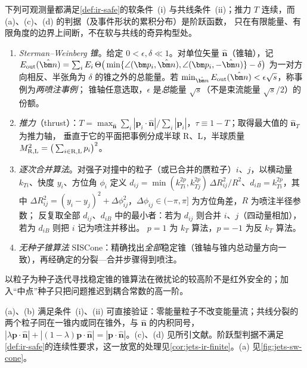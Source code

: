 \begin{definition}[红外安全的喷注定义与事件形状]\label{def:jets-algorithms}
下列可观测量都满足\cref{def:ir-safe}的软条件~(i) 与共线条件~(ii)；推力 $T$ 连续，而 (a)、(c)、(d) 的判据（及事件形状的累积分布）是阶跃函数，
只在有限能量、有限角度的边界上间断，不在软与共线的奇异构型处。
\begin{enumerate}[label=(\alph*),leftmargin=2.2em,itemsep=1pt,topsep=2pt]
\item \emph{Sterman--Weinberg 锥}\cite{StermanWeinberg1977}。给定 $0<\epsilon,\delta\ll1$。对单位矢量 $\hat{\bm n}$（锥轴），记
$E_{\rm out}(\hat{\bm n})=\sum_iE_i\,\Theta\big(\min\{\angle(\bm p_i,\hat{\bm n}),\angle(\bm p_i,-\hat{\bm n})\}-\delta\big)$
为一对方向相反、半张角为 $\delta$ 的锥之外的总能量。若 $\min_{\hat{\bm n}}E_{\rm out}(\hat{\bm n})<\epsilon\sqrt s$，称事例为\emph{两喷注事例}；
锥轴任意选取，$\epsilon$ 是\emph{总}能量 $\sqrt s$（不是束流能量 $\sqrt s/2$）的份额。
\item \emph{推力}（thrust）\cite{Farhi1977}：$T=\max_{\hat{\bm n}}\sum_i|\bm p_i\cdot\hat{\bm n}|/\sum_i|\bm p_i|$，$\tau\equiv1-T$；取得最大值的 $\hat{\bm n}_T$ 为推力轴，
垂直于它的平面把事例分成半球 R、L，半球质量 $M_{\rm R,L}^2=\big(\sum_{i\in\mathrm{R,L}}p_i\big)^2$。
\item \emph{逐次合并算法}。对强子对撞中的粒子（或已合并的赝粒子）$i$、$j$，以横动量 $k_{Ti}$、快度 $y_i$、方位角 $\phi_i$ 定义
$d_{ij}=\min(k_{Ti}^{2p},k_{Tj}^{2p})\,\Delta R_{ij}^2/R^2$、$d_{iB}=k_{Ti}^{2p}$，其中 $\Delta R_{ij}^2=(y_i-y_j)^2+\Delta\phi_{ij}^2$，$\Delta\phi_{ij}\in(-\pi,\pi]$ 为方位角差，$R$ 为喷注半径参数；
反复取全部 $d_{ij}$、$d_{iB}$ 中的最小者：若为 $d_{ij}$ 则合并 $i$、$j$（四动量相加），若为 $d_{iB}$ 则把 $i$ 记为喷注并移出。
$p=1$ 为 $k_T$ 算法\cite{CataniEtAl1993kt,EllisSoper1993}，$p=-1$ 为反 $k_T$ 算法\cite{CacciariSalamSoyez2008}。
\item \emph{无种子锥算法} SISCone\cite{SalamSoyez2007}：精确找出\emph{全部}稳定锥（锥轴与锥内总动量方向一致），再经确定的分裂—合并步骤得到喷注。
\end{enumerate}
以粒子为种子迭代寻找稳定锥的锥算法在微扰论的较高阶不是红外安全的；加入“中点”种子只把问题推迟到耦合常数的高一阶\cite{SalamSoyez2007}。
\end{definition}

(a)、(b) 满足条件~(i)、(ii) 可直接验证：零能量粒子不改变能量流；共线分裂的两个粒子同在一锥内或同在锥外，与 $\hat{\bm n}$ 的内积同号，
$|\lambda\bm p\cdot\hat{\bm n}|+|(1-\lambda)\bm p\cdot\hat{\bm n}|=|\bm p\cdot\hat{\bm n}|$。(c)、(d) 见所引文献。阶跃型判据不满足\cref{def:ir-safe}的连续性要求，这一放宽的处理见\cref{cor:jets-ir-finite}。(a) 见\cref{fig:jets-sw-cone}。

